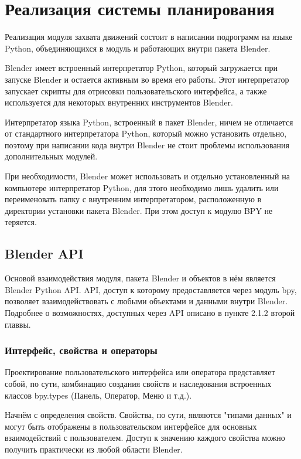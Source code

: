 \section{Реализация системы планирования }

Реализация модуля захвата движений состоит в написании подрограмм на языке Python, объединяющихся в модуль и работающих внутри пакета Blender.

Blender имеет встроенный интерпретатор Python, который загружается при запуске Blender и остается активным во время его работы. Этот интерпретатор запускает скрипты для отрисовки пользовательского интерфейса, а также используется для некоторых внутренних инструментов Blender.

Интерпретатор языка Python, встроенный в пакет Blender, ничем не отличается от стандартного интерпретатора Python, который можно установить отдельно, поэтому при написании кода внутри Blender не стоит проблемы использования дополнительных модулей.

При необходимости, Blender может использовать и отдельно установленный на компьютере интерпретатор Python, для этого необходимо лишь удалить или переименовать папку с внутренним интерпретатором, расположенную в директории установки пакета Blender. При этом доступ к модулю BPY не теряется.

\subsection {Blender API}

Основой взаимодействия модуля, пакета Blender и объектов в нём является Blender Python API. API, доступ к которому предоставляется через модуль bpy, позволяет взаимодействовать с любыми объектами и данными внутри Blender. Подробнее о возможностях, доступных через API описано в пункте 2.1.2 второй главвы.

\subsubsection{Интерфейс, свойства и операторы}

Проектирование пользовательского интерфейса или оператора представляет собой, по сути, комбинацию создания свойств и наследования встроенных классов bpy.types (Панель, Оператор, Меню и т.д.).

Начнём с определения свойств. Свойства, по сути, являются "типами данных" и могут быть отображены в пользовательском интерфейсе для основных взаимодействий с пользователем. Доступ к значению каждого свойства можно получить практически из любой области Blender. 

